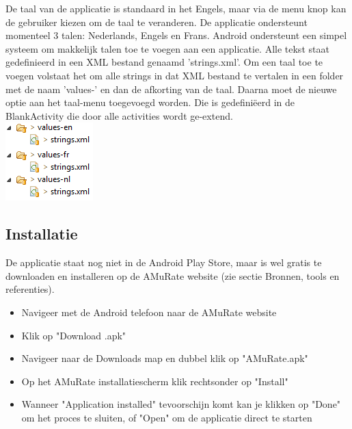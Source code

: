 \documentclass[11pt,a4paper]{article}
\begin{document}
	De taal van de applicatie is standaard in het Engels, maar via de menu knop kan de gebruiker kiezen om de taal te veranderen. De applicatie ondersteunt momenteel 3 talen: Nederlands, Engels en Frans. Android ondersteunt een simpel systeem om makkelijk talen toe te voegen aan een applicatie. Alle tekst staat gedefinieerd in een XML bestand genaamd 'strings.xml'. Om een taal toe te voegen volstaat het om alle strings in dat XML bestand te vertalen in een folder met de naam 'values-' en dan de afkorting van de taal. Daarna moet de nieuwe optie aan het taal-menu toegevoegd worden. Die is gedefiniëerd in de BlankActivity die door alle activities wordt ge-extend. \\
	\includegraphics[scale=1]{Pictures/lang_folder.png}
	
	\subsection{Installatie}
	\label{sec:Installatie}
	De applicatie staat nog niet in de Android Play Store, maar is wel gratis te downloaden en installeren op de AMuRate website (zie sectie Bronnen, tools en referenties). 
	\begin{itemize}
		\item Navigeer met de Android telefoon naar de AMuRate website 
		\item Klik op "Download .apk"
		\item Navigeer naar de Downloads map en dubbel klik op "AMuRate.apk"
		\item Op het AMuRate installatiescherm klik rechtsonder op "Install"
		\item Wanneer "Application installed" tevoorschijn komt kan je klikken op "Done" om het proces te sluiten, of "Open" om de applicatie direct te starten
	\end{itemize}
	
	
	
	\newpage
\end{document}
